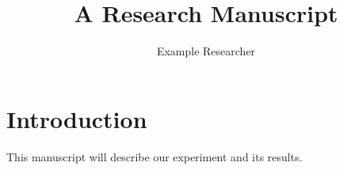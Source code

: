 \documentclass{article}
\title{A Research Manuscript}
\author{Example Researcher}
\date{}
\begin{document}
\maketitle
\section{Introduction}
This manuscript will describe our experiment and its results.
\end{document}
